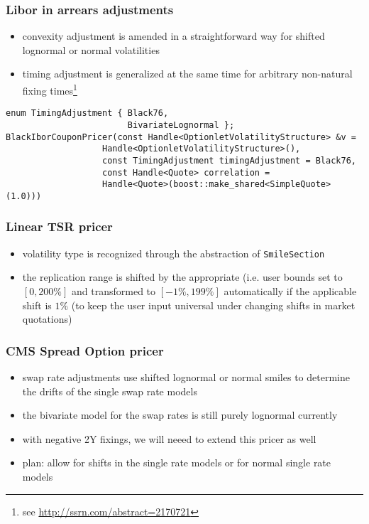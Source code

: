 \documentclass{beamer}
\begin{document}
\begin{frame}[fragile]
\frametitle{Libor in arrears adjustments}
\begin{itemize}
\item convexity adjustment is amended in a straightforward way for  shifted lognormal or normal volatilities
\item timing adjustment is generalized at the same time for arbitrary non-natural fixing times\footnote{see \url{http://ssrn.com/abstract=2170721}}
\end{itemize}
\begin{verbatim}
enum TimingAdjustment { Black76,
                        BivariateLognormal };
BlackIborCouponPricer(const Handle<OptionletVolatilityStructure> &v =
                   Handle<OptionletVolatilityStructure>(),
                   const TimingAdjustment timingAdjustment = Black76,
                   const Handle<Quote> correlation =
                   Handle<Quote>(boost::make_shared<SimpleQuote>(1.0)))
\end{verbatim}
\end{frame}

\begin{frame}[fragile]
\frametitle{Linear TSR pricer}
\begin{itemize}
\item volatility type is recognized through the abstraction of \verb+SmileSection+
\item the replication range is shifted by the appropriate (i.e. user bounds set to $[0,200\%]$ and transformed to $[-1\%,199\%]$ automatically if the applicable shift is $1\%$ (to keep the user input universal under changing shifts in market quotations)
\end{itemize}
\end{frame}

\begin{frame}[fragile]
\frametitle{CMS Spread Option pricer}
\begin{itemize}
\item swap rate adjustments use shifted lognormal or normal smiles to determine the drifts of the single swap rate models
\item the bivariate model for the swap rates is still purely lognormal currently
\item with negative 2Y fixings, we will neeed to extend this pricer as well
\item plan: allow for shifts in the single rate models or for normal single rate models
\end{itemize}
\end{frame}
\end{document}
